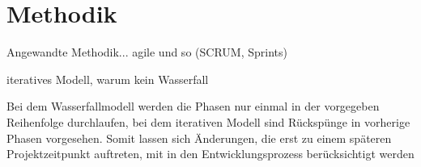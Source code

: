 \chapter{Methodik}
	Angewandte Methodik... agile und so (SCRUM, Sprints)
	
	iteratives Modell, warum kein Wasserfall
	
	Bei dem Wasserfallmodell werden die Phasen nur einmal in der vorgegeben Reihenfolge durchlaufen, bei dem iterativen Modell sind Rückspünge in vorherige Phasen vorgesehen. Somit lassen sich Änderungen, die erst zu einem späteren Projektzeitpunkt auftreten, mit in den Entwicklungsprozess berücksichtigt werden 